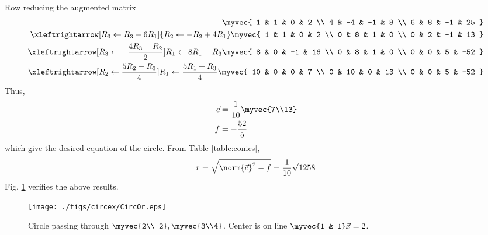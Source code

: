 \begin{enumerate}[label=\thesection.\arabic*.,ref=\thesection.\theenumi]
\begin{align}
\end{align}
Row reducing the augmented matrix
\begin{align}
\myvec{
1 & 1 & 0 & 2
\\
4 & -4 & -1 & 8
\\ 
6 & 8 & -1  & 25
}
\\
\xleftrightarrow[R_3 \leftarrow R_3 -6R_1]{R_2 \leftarrow -R_2+4R_1}
\myvec{
1 & 1 & 0 & 2
\\
0 & 8 & 1 & 0
\\ 
0 & 2 & -1  & 13
}
\\
\xleftrightarrow[R_3 \leftarrow -\frac{4R_3 -R_2}{2}]{R_1 \leftarrow 8R_1-R_3}
\myvec{
8 & 0 & -1 & 16
\\
0 & 8 & 1 & 0
\\ 
0 & 0 & 5  & -52
}
\\
\xleftrightarrow[R_2 \leftarrow \frac{5R_2 -R_3}{4}]{R_1 \leftarrow \frac{5R_1+R_3}{4}}
\myvec{
10 & 0 & 0 & 7
\\
0 & 10 & 0 & 13
\\ 
0 & 0 & 5  & -52
}
\end{align}
Thus, 
\begin{align}
\vec{c} &= \frac{1}{10}\myvec{7\\13}
\\
f &=-\frac{52}{5}
\end{align}
which give the desired equation of the circle.
From Table \ref{table:conics},
%
\begin{align}
 r =  \sqrt{\norm{\vec{c}}^2-f} = \frac{1}{10}\sqrt{1258}
\end{align}
Fig. \ref{fig:CircOr}	verifies the above results.

\begin{figure}[!ht]
\centering
\texttt{[image: ./figs/circex/CircOr.eps]}
\caption{Circle passing through $\myvec{2\\-2},\myvec{3\\4}$. Center is on line $\myvec{1 & 1}\vec{x}=2$. }
\label{fig:CircOr}	
\end{figure}


\end{enumerate}
